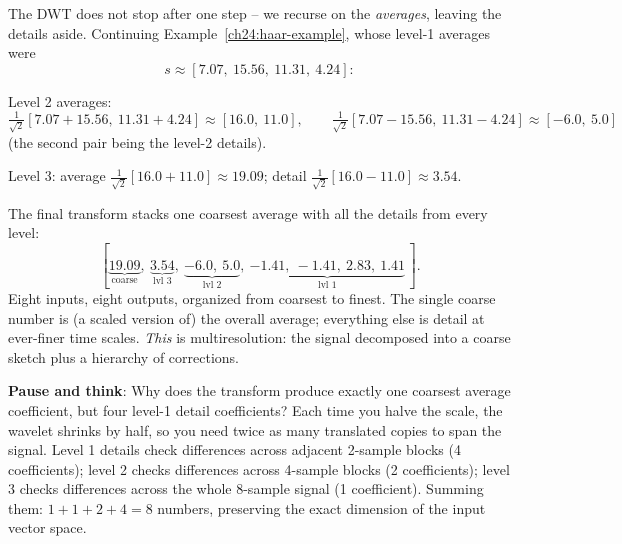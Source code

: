 \begin{example}
\label{ch24:haar-pyramid}
The DWT does not stop after one step -- we recurse on the
\emph{averages}, leaving the details aside. Continuing Example~\ref{ch24:haar-example},
whose level-1 averages were
\[
  s \approx [7.07,\ 15.56,\ 11.31,\ 4.24]:
\]

Level 2 averages:
\[
\tfrac{1}{\sqrt2}[7.07{+}15.56,\ 11.31{+}4.24] \approx [16.0,\ 11.0],
\qquad
\tfrac{1}{\sqrt2}[7.07{-}15.56,\ 11.31{-}4.24] \approx [-6.0,\ 5.0]
\]
(the second pair being the level-2 details).

Level 3: average $\tfrac{1}{\sqrt2}[16.0{+}11.0] \approx 19.09$; detail
$\tfrac{1}{\sqrt2}[16.0{-}11.0] \approx 3.54$.

The final transform stacks one coarsest average with all the details from every
level:
\[
[\underbrace{19.09}_{\text{coarse}},\ \underbrace{3.54}_{\text{lvl 3}},\
\underbrace{-6.0,\ 5.0}_{\text{lvl 2}},\
\underbrace{-1.41,\ -1.41,\ 2.83,\ 1.41}_{\text{lvl 1}}\,].
\]
Eight inputs, eight outputs, organized from coarsest to finest. The single coarse
number is (a scaled version of) the overall average; everything else is detail at
ever-finer time scales. \emph{This} is multiresolution: the signal decomposed into
a coarse sketch plus a hierarchy of corrections.
\end{example}

\begin{recoverybox}
\textbf{Pause and think}: Why does the transform produce exactly one coarsest average coefficient, but four level-1 detail coefficients? Each time you halve the scale, the wavelet shrinks by half, so you need twice as many translated copies to span the signal. Level 1 details check differences across adjacent 2-sample blocks (4 coefficients); level 2 checks differences across 4-sample blocks (2 coefficients); level 3 checks differences across the whole 8-sample signal (1 coefficient). Summing them: $1 + 1 + 2 + 4 = 8$ numbers, preserving the exact dimension of the input vector space.
\end{recoverybox}

